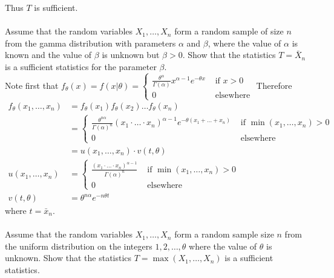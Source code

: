 \documentclass[12pt]{article}
\begin{document}
Thus $T$ is sufficient. \\~\\
Assume that the random variables $X_1,\dots,X_n$ form a random sample of size $n$ from the gamma distribution with parameters $\alpha$ and $\beta$, where the value of $\alpha$ is known and the value of $\beta$ is unknown but $\beta > 0$. Show that the statistics $T = \bar{X}_n$ is a sufficient statistics for the parameter $\beta$. \\
Note first that $f_\theta(x) = f(x|\theta) = \begin{cases} \frac{\theta^\alpha}{\Gamma(\alpha)} x^{\alpha-1}e^{-\theta x} &\text{ if } x > 0 \\ 0 &\text{ elsewhere} \end{cases} $
Therefore $$ \begin{aligned} f_{\theta}(x_1,\dots,x_n) &= f_\theta(x_1)f_\theta(x_2)\dots f_\theta(x_n) \\ &= \begin{cases} \frac{\theta^{n\alpha}}{\Gamma(\alpha)^n} (x_1 \cdot \dots \cdot x_n)^{\alpha-1} e^{-\theta(x_1+\dots+x_n)} &\text{ if } \min(x_1,\dots,x_n) > 0 \\ 0 &\text{ elsewhere} \end{cases} \\ &= u(x_1,\dots,x_n) \cdot v(t,\theta) \\ u(x_1,\dots,x_n) &= \begin{cases} \frac{(x_1 \cdot \dots \cdot x_n)^{\alpha-1}}{\Gamma(\alpha)^n} &\text{ if } \min(x_1,\dots,x_n) > 0 \\ 0 &\text{ elsewhere} \end{cases} \\ v(t,\theta) &= \theta^{n\alpha} e^{-n\theta t} \end{aligned} $$ where $t = \bar{x}_n$. \\~\\
Assume that the random variables $X_1,\dots,X_n$ form a random sample size $n$ from the uniform distribution on the integers $1,2,\dots,\theta$ where the value of $\theta$ is unknown. Show that the statistics $T = \max(X_1,\dots,X_n)$ is a sufficient statistics. \\
\end{document}
